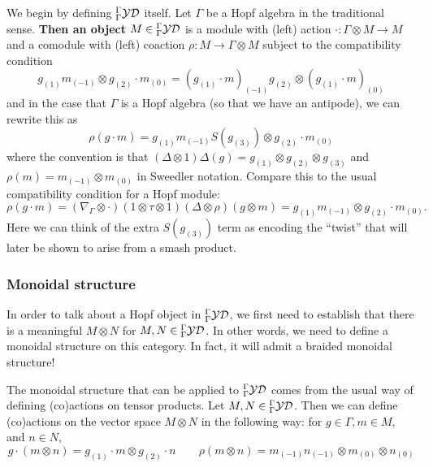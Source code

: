 \documentclass[12pt]{article}
\begin{document}
We begin by defining ${^\Gamma_\Gamma\mathcal{YD}}$ itself. Let $\Gamma$ be a Hopf algebra in the traditional sense. \textbf{Then an object $M\in {^\Gamma_\Gamma\mathcal{YD}}$} is a module with (left) action $\cdot:\Gamma\otimes M\to M$ and a comodule with (left) coaction $\rho:M\to \Gamma\otimes M$ subject to the compatibility condition
\begin{equation}\label{eq:yd-condition}
    g_{(1)}m_{(-1)}\otimes g_{(2)}\cdot m_{(0)}=(g_{(1)}\cdot m)_{(-1)}g_{(2)}\otimes (g_{(1)}\cdot m)_{(0)}
\end{equation}
and in the case that $\Gamma$ is a Hopf algebra (so that we have an antipode), we can rewrite this as
\begin{equation}\label{eq:hopf-yd-condition}
    \rho(g\cdot m)=g_{(1)}m_{(-1)}S(g_{(3)})\otimes g_{(2)}\cdot m_{(0)}
\end{equation}
where the convention is that $(\Delta\otimes 1)\Delta(g)=g_{(1)}\otimes g_{(2)}\otimes g_{(3)}$ and $\rho(m)=m_{(-1)}\otimes m_{(0)}$ in Sweedler notation. Compare this to the usual compatibility condition for a Hopf module:
\[\rho(g\cdot m)=(\nabla_\Gamma\otimes \cdot)(1\otimes\tau\otimes 1)(\Delta\otimes\rho)(g\otimes m)=g_{(1)}m_{(-1)}\otimes g_{(2)}\cdot m_{(0)}.\]
Here we can think of the extra $S(g_{(3)})$ term as encoding the ``twist'' that will later be shown to arise from a smash product.

\subsubsection{Monoidal structure}
In order to talk about a Hopf object in ${^\Gamma_\Gamma\mathcal{YD}}$, we first need to establish that there is a meaningful $M\otimes N$ for $M,N\in{^\Gamma_\Gamma\mathcal{YD}}$. In other words, we need to define a monoidal structure on this category. In fact, it will admit a braided monoidal structure!

The monoidal structure that can be applied to ${^\Gamma_\Gamma\mathcal{YD}}$ comes from the usual way of defining (co)actions on tensor products. Let $M,N\in{^\Gamma_\Gamma\mathcal{YD}}$. Then we can define (co)actions on the vector space $M\otimes N$ in the following way: for $g\in \Gamma, m\in M,$ and $n\in N,$
\begin{equation}\label{eq:tensor-action-coaction}
    g\cdot (m\otimes n)=g_{(1)}\cdot m\otimes g_{(2)}\cdot n\qquad \rho(m\otimes n)=m_{(-1)}n_{(-1)}\otimes m_{(0)}\otimes n_{(0)}
\end{equation}
\end{document}
